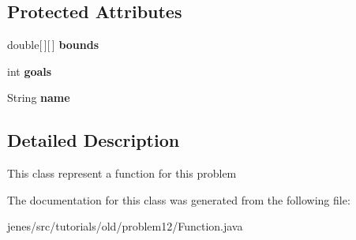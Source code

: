 \subsection*{Protected Attributes}
\begin{DoxyCompactItemize}
\item 
\hypertarget{classjenes_1_1tutorials_1_1old_1_1problem12_1_1_function_a0a732b2084fd09b6d69858b21a780a05}{double\mbox{[}$\,$\mbox{]}\mbox{[}$\,$\mbox{]} {\bfseries bounds}}\label{classjenes_1_1tutorials_1_1old_1_1problem12_1_1_function_a0a732b2084fd09b6d69858b21a780a05}

\item 
\hypertarget{classjenes_1_1tutorials_1_1old_1_1problem12_1_1_function_a9ad846e268721b5a9d5d3e15763d5400}{int {\bfseries goals}}\label{classjenes_1_1tutorials_1_1old_1_1problem12_1_1_function_a9ad846e268721b5a9d5d3e15763d5400}

\item 
\hypertarget{classjenes_1_1tutorials_1_1old_1_1problem12_1_1_function_a6cc32f98e4932a3251cbaffdf08b9773}{String {\bfseries name}}\label{classjenes_1_1tutorials_1_1old_1_1problem12_1_1_function_a6cc32f98e4932a3251cbaffdf08b9773}

\end{DoxyCompactItemize}


\subsection{Detailed Description}
This class represent a function for this problem 

The documentation for this class was generated from the following file\-:\begin{DoxyCompactItemize}
\item 
jenes/src/tutorials/old/problem12/Function.\-java\end{DoxyCompactItemize}
